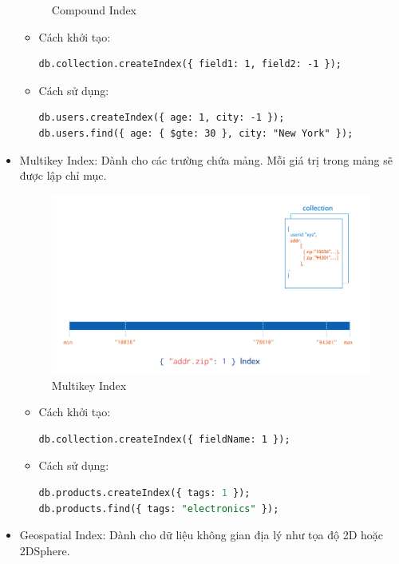 \begin{itemize}
\begin{figure}[H]
        \caption{Compound Index}
    \end{figure}
        \begin{itemize}
            \item Cách khởi tạo:
\begin{lstlisting}[language=inform]
db.collection.createIndex({ field1: 1, field2: -1 });
\end{lstlisting}
            \item Cách sử dụng:
\begin{lstlisting}[language=inform]
db.users.createIndex({ age: 1, city: -1 });
db.users.find({ age: { $gte: 30 }, city: "New York" });
\end{lstlisting}
        \end{itemize}
    \item Multikey Index: Dành cho các trường chứa mảng. Mỗi giá trị trong mảng sẽ được lập chỉ mục.
    \begin{figure}[H]
        \centering
        \includegraphics[width=\textwidth]{Image/2.2.3c.png}
        \caption{Multikey Index}
    \end{figure}
        \begin{itemize}
            \item Cách khởi tạo:
\begin{lstlisting}[language=inform]
db.collection.createIndex({ fieldName: 1 });
\end{lstlisting}
            \item Cách sử dụng:
\begin{lstlisting}[language=SQL]
db.products.createIndex({ tags: 1 });
db.products.find({ tags: "electronics" });
\end{lstlisting}
        \end{itemize}
    \item Geospatial Index: Dành cho dữ liệu không gian địa lý như tọa độ 2D hoặc 2DSphere.

\end{itemize}
